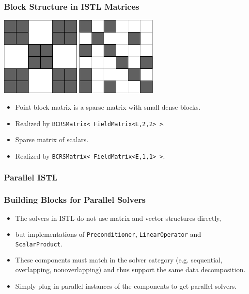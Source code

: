 \begin{frame}[fragile]
\frametitle{Block Structure in ISTL Matrices}
\begin{block}{}
\includegraphics[width=0.3\textwidth]{./EPS/pointblockmatrix}\hfill
\includegraphics[width=0.3\textwidth]{./EPS/scalarmatrix}

\begin{minipage}{0.48\textwidth}
  \begin{itemize}
  \item  Point block matrix is a sparse matrix with small dense
blocks.
\item Realized by \lstinline[basicstyle=\tiny]!BCRSMatrix< FieldMatrix<E,2,2> >!. 
  \end{itemize}
\end{minipage}
\begin{minipage}{0.48\textwidth}
  \begin{itemize}
  \item Sparse matrix of scalars.
  \item Realized by \lstinline[basicstyle=\tiny]!BCRSMatrix< FieldMatrix<E,1,1> >!.
  \end{itemize}
\end{minipage}
\end{block}
\end{frame}

\subsubsection{Parallel ISTL}
\begin{frame}
  \frametitle{Building Blocks for Parallel Solvers}

  \begin{itemize}
  \item The solvers in ISTL do not use matrix and vector structures
    directly,
  \item but implementations of \lstinline!Preconditioner!,
    \lstinline!LinearOperator! and \lstinline!ScalarProduct!.
  \item These components must match in the solver category
    (e.g. sequential, overlapping, nonoverlapping) and thus support
    the same data decomposition.
  \item Simply plug in parallel instances of the components to get
    parallel solvers.
  \end{itemize}
\end{frame}

